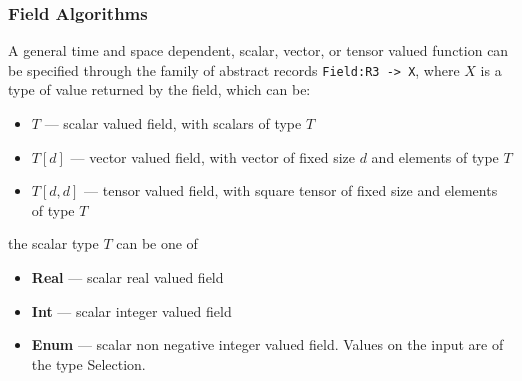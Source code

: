 \subsubsection{Field Algorithms}
\label{sec:Fields}\hypertarget{sec:Fields}{}

A general time and space dependent, scalar, vector, or  tensor valued function can be specified through the family of abstract records 
\verb'Field:R3 -> X', where $X$ is a type of value returned by the field, which can be:
\begin{itemize}
 \item $T$ --- scalar valued field, with scalars of type $T$
 \item $T[d]$ --- vector valued field, with vector of fixed size $d$ and elements of type $T$
 \item $T[d, d]$ --- tensor valued field, with square tensor of fixed size and elements of type $T$
\end{itemize}
the scalar type $T$ can be one of
\begin{itemize}
 \item {\bf Real} --- scalar real valued field
 \item {\bf Int}  --- scalar integer valued field
 \item {\bf Enum} --- scalar non negative integer valued field. Values on the input are of the type Selection.
\end{itemize}

